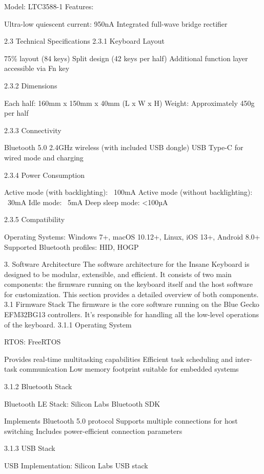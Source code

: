 \documentclass[a4paper,11pt]{article}%
\begin{document}
Model: LTC3588-1
Features:

Ultra-low quiescent current: 950nA
Integrated full-wave bridge rectifier



2.3 Technical Specifications
2.3.1 Keyboard Layout

75\% layout (84 keys)
Split design (42 keys per half)
Additional function layer accessible via Fn key

2.3.2 Dimensions

Each half: 160mm x 150mm x 40mm (L x W x H)
Weight: Approximately 450g per half

2.3.3 Connectivity

Bluetooth 5.0
2.4GHz wireless (with included USB dongle)
USB Type-C for wired mode and charging

2.3.4 Power Consumption

Active mode (with backlighting): ~100mA
Active mode (without backlighting): ~30mA
Idle mode: ~5mA
Deep sleep mode: <100µA

2.3.5 Compatibility

Operating Systems: Windows 7+, macOS 10.12+, Linux, iOS 13+, Android 8.0+
Supported Bluetooth profiles: HID, HOGP


3. Software Architecture
The software architecture for the Insane Keyboard is designed to be modular, extensible, and efficient. It consists of two main components: the firmware running on the keyboard itself and the host software for customization. This section provides a detailed overview of both components.
3.1 Firmware Stack
The firmware is the core software running on the Blue Gecko EFM32BG13 controllers. It's responsible for handling all the low-level operations of the keyboard.
3.1.1 Operating System

RTOS: FreeRTOS

Provides real-time multitasking capabilities
Efficient task scheduling and inter-task communication
Low memory footprint suitable for embedded systems



3.1.2 Bluetooth Stack

Bluetooth LE Stack: Silicon Labs Bluetooth SDK

Implements Bluetooth 5.0 protocol
Supports multiple connections for host switching
Includes power-efficient connection parameters



3.1.3 USB Stack

USB Implementation: Silicon Labs USB stack
\end{document}
